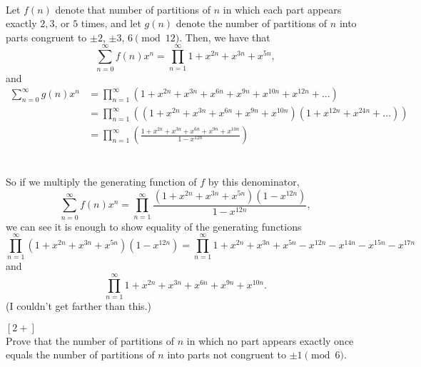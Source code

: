 \documentclass{article}
\newenvironment{problem}[2][Problem]{\begin{trivlist}
\item[\hskip \labelsep {\bfseries #1}\hskip \labelsep {\bfseries #2.}]}{\end{trivlist}}
\newenvironment{solution}[1][Solution.]{\begin{trivlist}
\item[\hskip \labelsep {\bfseries #1}]}{\end{trivlist}}
\begin{document}
\begin{solution} \text{} \\
  Let $f(n)$ denote that number of partitions of $n$ in which each part appears
  exactly $2, 3$, or $5$ times, and
  let $g(n)$ denote the number of partitions of $n$ into parts congruent to
  $\pm2$, $\pm3$, $6 \pmod{12}$.
  Then, we have that
  \[
    \sum_{n=0}^\infty f(n)x^n = \prod_{n = 1}^\infty 1 + x^{2n} + x^{3n} + x^{5n},
  \]
  and
  \begin{align*}
    \sum_{n=0}^\infty g(n)x^n
    &= \prod_{n = 1}^\infty\left(1 + x^{2n} + x^{3n} + x^{6n} + x^{9n} + x^{10n} + x^{12n} + \hdots\right) \\
    &= \prod_{n = 1}^\infty\left(
      (1 + x^{2n} + x^{3n} + x^{6n} + x^{9n} + x^{10n})(1 + x^{12n} + x^{24n} + \hdots)
    \right) \\
    &= \prod_{n = 1}^\infty\left(
      \frac{1 + x^{2n} + x^{3n} + x^{6n} + x^{9n} + x^{10n}}{1-x^{12n}}
    \right)
  \end{align*}
  \\~\\
  So if we multiply the generating function of $f$ by this denominator, \[
    \sum_{n=0}^\infty f(n)x^n = \prod_{n = 1}^\infty\frac{(1 + x^{2n} + x^{3n} + x^{5n})(1 - x^{12n})}{1 - x^{12n}},
  \] we can see it is enough to show equality of the generating functions \[
    \prod_{n = 1}^\infty(1 + x^{2n} + x^{3n} + x^{5n})(1 - x^{12n})
    = \prod_{n = 1}^\infty 1 + x^{2n} + x^{3n} + x^{5n} - x^{12n} - x^{14n} - x^{15n} - x^{17n}
  \] and \[
    \prod_{n = 1}^\infty 1 + x^{2n} + x^{3n} + x^{6n} + x^{9n} + x^{10n}.
  \]
  (I couldn't get farther than this.)
\end{solution}
\pagebreak
\begin{problem}{85} $[2+]$ \\
  Prove that the number of partitions of $n$ in which no part appears exactly
  once equals the number of partitions of $n$ into parts not congruent to
  $\pm 1 \pmod6$.
\end{problem}
\end{document}
